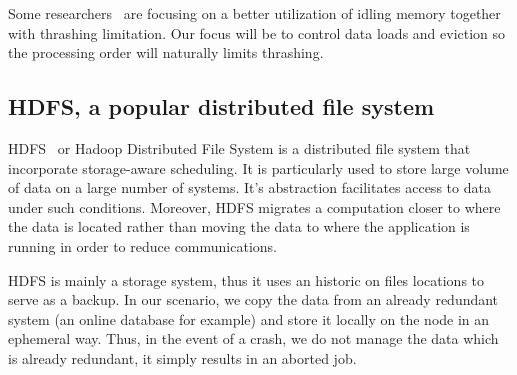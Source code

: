 \documentclass[conference,10pt]{IEEEtran}
\begin{document}

Some researchers~\cite{Nikolopoulos2003AdaptiveSU}
are focusing on a better utilization of idling memory together with 
thrashing limitation. Our focus will be to control data loads and eviction so the
processing order will naturally limits thrashing.

\subsection{HDFS, a popular distributed file system}
HDFS~\cite{hdfs} or Hadoop Distributed File System is a distributed file system that
incorporate storage-aware scheduling. It is particularly used to store large
volume of data on a large number of systems. It's abstraction facilitates access to data
under such conditions. Moreover, HDFS migrates a computation closer to where the data is
located rather than moving the data to where the application is running in order to reduce communications.

HDFS is mainly a storage system, thus it uses an historic on files locations to serve as a backup. 
In our scenario, we copy the data from an already redundant system (an online database for example) and store it locally on the node in an ephemeral way. Thus, in the event of a crash, we do not manage the data which is already redundant, it simply results in an aborted job.
\end{document}
